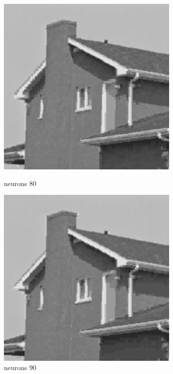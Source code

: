 \documentclass[../IDP_Task5_Karwowski_Kowalewski.tex]{subfiles}
\begin{document}
{{        \begin{figure}[!htbp]
            \begin{minipage}[c]{0.45\linewidth}
                \centering
                \includegraphics[width=0.8\textwidth]{img/kowalewski/crop_size_4_neurons_80.png}
                \caption{neurons 80}
            \end{minipage}\hfill
            \begin{minipage}[c]{0.45\linewidth}
                \centering
                \includegraphics[width=0.8\textwidth]{img/kowalewski/crop_size_4_neurons_90.png}
                \caption{neurons 90}
            \end{minipage}
        \end{figure}

}}
\end{document}
